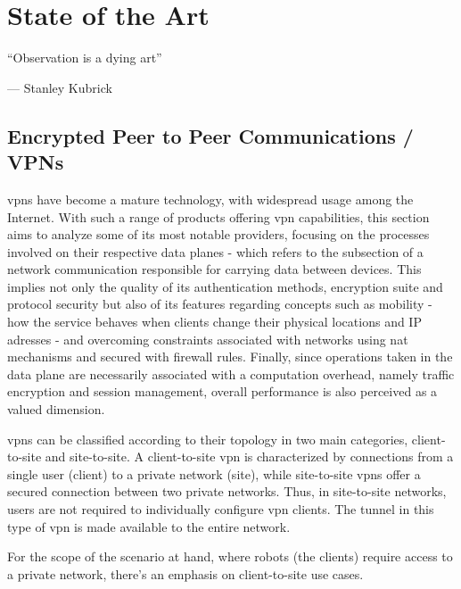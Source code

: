 \documentclass[11pt,twoside,a4paper]{report}
\begin{document}
\cleardoublepage


\chapter{State of the Art}
\label{chapter:sota}

\begin{minipage}{50mm}
     \centering %
     ``Observation is a dying art''
          \begin{flushright}
          --- Stanley Kubrick
          \end{flushright}
     \end{minipage}

\section{Encrypted Peer to Peer Communications / VPNs}

\acrshort{vpn}s have become a mature technology, with widespread usage among the Internet. With such a range of products offering \acrshort{vpn} capabilities, this section aims to analyze some of its most notable providers, focusing on the processes involved on their respective data planes - which refers to the subsection of a network communication responsible for carrying data between devices. This implies not only the quality of its authentication methods, encryption suite and protocol security but also of its features regarding concepts such as mobility - how the service behaves when clients change their physical locations and IP adresses - and overcoming constraints associated with networks using \acrshort{nat} mechanisms and secured with firewall rules. Finally, since operations taken in the data plane are necessarily associated with a computation overhead, namely traffic encryption and session management, overall performance is also perceived as a valued dimension.

\acrshort{vpn}s can be classified according to their topology in two main categories, client-to-site and site-to-site. A client-to-site \acrshort{vpn} is characterized by connections from a single user (client) to a private network (site), while site-to-site \acrshort{vpn}s offer a secured connection between two private networks. Thus, in site-to-site networks, users are not required to individually configure \acrshort{vpn} clients. The tunnel in this type of \acrshort{vpn} is made available to the entire network.

For the scope of the scenario at hand, where robots (the clients) require access to a private network, there's an emphasis on client-to-site use cases.
\end{document}
